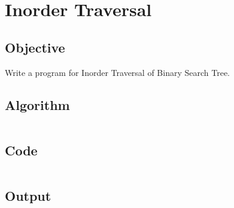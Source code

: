 \section{Inorder Traversal}
\label{sec:Inorder Traversal}

\subsection{Objective}
Write a program for Inorder Traversal of Binary Search Tree.

\subsection{Algorithm}
\begin{lstlisting}[style=mystyle]
\end{lstlisting}

\subsection{Code}
\inputminted[]{c}{../../Code/inorder.c}

\subsection{Output}
\begin{lstlisting}[style=output]
\end{lstlisting}

\pagebreak
